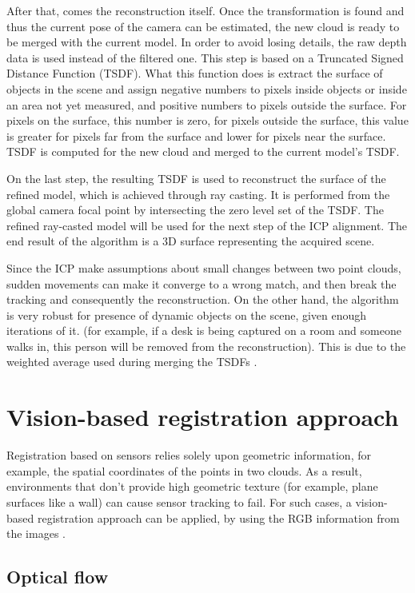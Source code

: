 \documentclass[msc, a4paper, classic, en]{ufbathesis}
\begin{document}
After that, comes the reconstruction itself. Once the transformation is found and thus the current pose of the camera can be estimated, the new cloud is ready to be merged with the current model. In order to avoid losing details, the raw depth data is used instead of the filtered one. This step is based on a Truncated Signed Distance Function (TSDF). What this function does is extract the surface of objects in the scene and assign negative numbers to pixels inside objects or inside an area not yet measured, and positive numbers to pixels outside the surface. For pixels on the surface, this number is zero, for pixels outside the surface, this value is greater for pixels far from the surface and lower for pixels near the surface. TSDF is computed for the new cloud and merged to the current model's TSDF.

On the last step, the resulting TSDF is used to reconstruct the surface of the refined model, which is achieved through ray casting. It is performed from the global camera focal point by intersecting the zero level set of the TSDF. The refined ray-casted model will be used for the next step of the ICP alignment. The end result of the algorithm is a 3D surface representing the acquired scene.

Since the ICP make assumptions about small changes between two point clouds, sudden movements can make it converge to a wrong match, and then break the tracking and consequently the reconstruction. On the other hand, the algorithm is very robust for presence of dynamic objects on the scene, given enough iterations of it. (for example, if a desk is being captured on a room and someone walks in, this person will be removed from the reconstruction). This is due to the weighted average used during merging the TSDFs \cite{michele}.

\section{Vision-based registration approach}

Registration based on sensors relies solely upon geometric information, for example, the spatial coordinates of the points in two clouds. As a result, environments that don't provide high geometric texture (for example, plane surfaces like a wall) can cause sensor tracking to fail. For such cases, a vision-based registration approach can be applied, by using the RGB information from the images \cite{kinectkanade}. 
\subsection{Optical flow}
\end{document}
